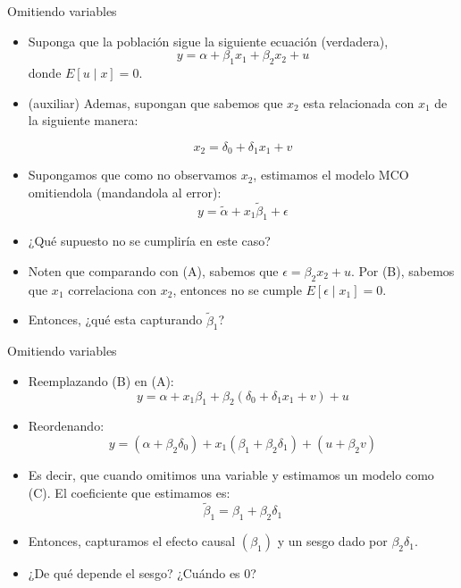 \documentclass[10pt,aspectratio=169]{beamer}
\begin{document}
\begin{frame}{Omitiendo variables}
    \begin{itemize}
        \item Suponga que la población sigue la siguiente ecuación (verdadera),
        \begin{equation*}
            y=\alpha+ \beta_{1}x_{1}+\beta_{2} x_{2}+u \tag{A}
        \end{equation*}
        donde $E[u \mid x]=0$.
        \item (auxiliar) Ademas, supongan que sabemos que $x_{2}$ esta relacionada con $x_{1}$ de la siguiente manera:
        
        \begin{equation*}
        x_{2}=\delta_{0}+\delta_{1} x_{1}+v \tag{B}
        \end{equation*}
        
        \item Supongamos que como no observamos $x_{2}$, estimamos el modelo MCO omitiendola (mandandola al error):
        \begin{equation*}
        y=\tilde{\alpha}+x_{1} \tilde{\beta}_{1}+\epsilon \tag{C}
        \end{equation*}
        \item ¿Qué supuesto no se cumpliría en este caso?
        \item Noten que comparando con (A), sabemos que $\epsilon=\beta_{2} x_{2}+u$. Por (B), sabemos que $x_{1}$ correlaciona con $x_{2}$, entonces no se cumple $E\left[\epsilon \mid x_{1}\right]=0$.
        \item Entonces, ¿qué esta capturando $\tilde{\beta}_{1}$?
    \end{itemize}
\end{frame}

\begin{frame}{Omitiendo variables}
    \begin{itemize}
        \item Reemplazando (B) en (A):
        $$
        y=\alpha+x_{1} \beta_{1}+\beta_{2}\left(\delta_{0}+\delta_{1} x_{1}+v\right)+u
        $$
        \item Reordenando:
        $$
        y=\left(\alpha+\beta_2\delta_{0}\right)+x_{1}\left(\beta_{1}+\beta_{2} \delta_{1}\right)+\left(u+\beta_{2} v\right)
        $$
        \item Es decir, que cuando omitimos una variable y estimamos un modelo como (C). El coeficiente que estimamos es:
        $$
        \tilde{\beta}_{1}=\beta_{1}+\beta_{2} \delta_{1}
        $$
        \item Entonces, capturamos el efecto causal $\left(\beta_{1}\right)$ y un sesgo dado por $\beta_{2} \delta_{1}$.
        \item ¿De qué depende el sesgo? ¿Cuándo es 0?
    \end{itemize}
\end{frame}
\end{document}
